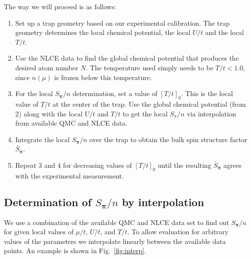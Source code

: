 \documentclass[11pt,letter]{article}
\newcommand{\bv}[1]{\ensuremath{\bm{#1}}}
\begin{document}
The way we will proceed is as follows:

\begin{enumerate}

  \item Set up a trap geometry based on our experimental calibration.  The trap
geometry determines the local chemical potential, the local $U/t$ and the local
$T/t$. 

  \item Use the NLCE data to find the global chemical potential that produces
the desired atom number $N$.   The temperature used simply needs to be $T/t <
1.0$, since $n(\mu)$ is frozen below this temperature.   

  \item For the local $S_{\bv{\pi}}/n$ determination, set a value of
$[T/t]_{0}$.  This is the local value of $T/t$ at the center of the trap.  Use
the global chemical potential (from 2) along with the local $U/t$ and $T/t$ to
get the local $S_{\pi}/n$ via interpolation from available QMC and NLCE data.
 
  \item Integrate the local $S_{\bv{\pi}}/n$ over the trap to obtain the bulk spin
structure factor $\bar{S}_{\bv{\pi}}$. 

  \item Repeat 3 and 4 for decreasing values of $[T/t]_{0}$ until the resulting
$\bar{S}_{\bv{\pi}}$ agrees with the experimental measurement.  
\end{enumerate}

\subsection{ Determination of $S_{\bv{\pi}}/n$  by interpolation} 

We use a combination of the available QMC and NLCE data set to find out
$S_{\bv{\pi}}/n$ for given local values of  $\mu/t$, $U/t$, and $T/t$.   To allow
evaluation for arbitrary values of the parameters we interpolate linearly
between the available data points.  An example is shown in
Fig.~\ref{fig:interp}.  
\end{document}
